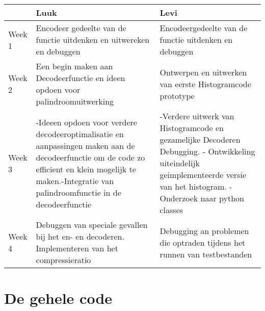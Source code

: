 \documentclass{article}
\begin{document}
\begin{tabular}{ l | p{6cm} p{6cm} }
   & Luuk & Levi \\
  \hline
  Week 1 & Encodeer gedeelte van de functie uitdenken en uitwereken en debuggen & Encodeergedeelte van de functie uitdenken en debuggen \\
  Week 2 & Een begin maken aan Decodeerfunctie en ideen opdoen voor palindroomuitwerking & Ontwerpen en uitwerken van eerste Histogramcode prototype \\
  Week 3 & -Ideeen opdoen voor verdere decodeeroptimalisatie en aanpassingen maken aan de decodeerfunctie om de code zo efficient en klein mogelijk te maken.\linebreak -Integratie van palindroomfunctie in de decodeerfunctie & -Verdere uitwerk van Histogramcode en gezamelijke Decoderen Debugging. \linebreak - Ontwikkeling uiteindelijk geimplementeerde versie van het histogram.  \linebreak  - Onderzoek naar python classes \\
  Week 4  & Debuggen van speciale gevallen bij het en- en decoderen. Implementeren van het compressieratio & Debugging an problemen die optraden tijdens het runnen van testbestanden \\
 
 
 
  
\end{tabular}

\section{De gehele code}

\end{document}
